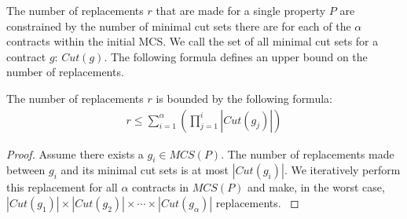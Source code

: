 The number of replacements $r$ that are made for a single property $P$ are constrained by the number of minimal cut sets there are for each of the $\alpha$ contracts within the initial MCS. We call the set of all minimal cut sets for a contract $g$: $\mathit{Cut(g)}$. The following formula defines an upper bound on the number of replacements. 

\begin{lemma}
The number of replacements $r$ is bounded by the following formula:
\begin{gather}
\label{eq:bound}
  r \leq {\displaystyle \sum_{i=1}^{\alpha} }({\displaystyle \prod_{j=1}^{i} |\mathit{Cut(g_j)}|})  
\end{gather}
\begin{proof}
Assume there exists a $g_i \in \mathit{MCS(P)}$. The number of replacements made between $g_i$ and its minimal cut sets is at most $|\mathit{Cut(g_i)}|$. We iteratively perform this replacement for all $\alpha$ contracts in $\mathit{MCS(P)}$ and make, in the worst case, $|\mathit{Cut(g_1)}| \times |\mathit{Cut(g_2)}| \times \cdots \times |\mathit{Cut(g_\alpha)}|$ replacements.
\label{lemma:bound}
\end{proof}
\end{lemma}

